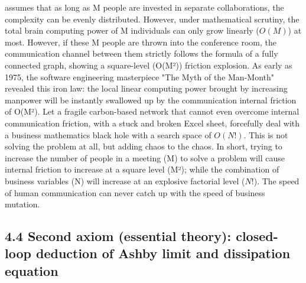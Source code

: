 \documentclass[11pt,a4paper]{article}
\begin{document}
assumes that as long as M people are invested in separate collaborations, the complexity can be evenly distributed. However, under mathematical scrutiny, the total brain computing power of M individuals can only grow linearly ($O(M)$) at most. However, if these M people are thrown into the conference room, the communication channel between them strictly follows the formula of a fully connected graph, showing a square-level (O(M²)) friction explosion. As early as 1975, the software engineering masterpiece "The Myth of the Man-Month" revealed this iron law: the local linear computing power brought by increasing manpower will be instantly swallowed up by the communication internal friction of O(M²). Let a fragile carbon-based network that cannot even overcome internal communication friction, with a stuck and broken Excel sheet, forcefully deal with a business mathematics black hole with a search space of $O(N!)$. This is not solving the problem at all, but adding chaos to the chaos. In short, trying to increase the number of people in a meeting (M) to solve a problem will cause internal friction to increase at a square level (M²); while the combination of business variables (N) will increase at an explosive factorial level ($N!$). The speed of human communication can never catch up with the speed of business mutation.


\subsection*{4.4 Second axiom (essential theory): closed-loop deduction of Ashby limit and dissipation equation}
\end{document}

